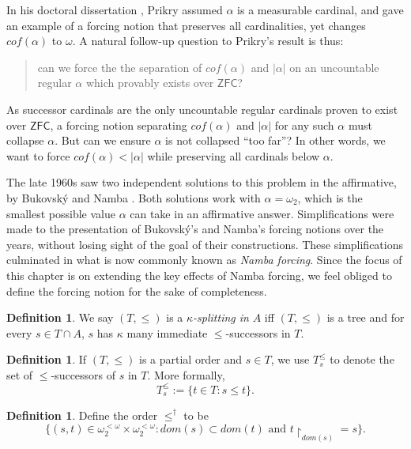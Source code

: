 \documentclass[12pt, twoside]{memoir}
\numberwithin{equation}{section}
\theoremstyle{definition}
\newtheorem{defi}[thm]{Definition}
\theoremstyle{remark}
\theoremstyle{definition}
\theoremstyle{definition}
\theoremstyle{definition}
\theoremstyle{remark}
\begin{document}
In his doctoral dissertation \cite{prikry}, Prikry assumed $\alpha$ is a measurable cardinal, and gave an example of a forcing notion that preserves all cardinalities, yet changes $cof(\alpha)$ to $\omega$. A natural follow-up question to Prikry's result is thus:

\begin{quote}
    can we force the the separation of $cof(\alpha)$ and $|\alpha|$ on an uncountable regular $\alpha$ which provably exists over $\mathsf{ZFC}$?
\end{quote}

As successor cardinals are the only uncountable regular cardinals proven to exist over $\mathsf{ZFC}$, a forcing notion separating $cof(\alpha)$ and $|\alpha|$ for any such $\alpha$ must collapse $\alpha$. But can we ensure $\alpha$ is not collapsed ``too far''? In other words, we want to force $cof(\alpha) < |\alpha|$ while preserving all cardinals below $\alpha$.

The late 1960s saw two independent solutions to this problem in the affirmative, by Bukovsk\'{y} \cite{bukovsky} and Namba \cite{namba}. Both solutions work with $\alpha = \omega_2$, which is the smallest possible value $\alpha$ can take in an affirmative answer. Simplifications were made to the presentation of Bukovsk\'{y}'s and Namba's forcing notions over the years, without losing sight of the goal of their constructions. These simplifications culminated in what is now commonly known as \emph{Namba forcing}. Since the focus of this chapter is on extending the key effects of Namba forcing, we feel obliged to define the forcing notion for the sake of completeness.

\begin{defi}
We say $(T, \leq)$ is a $\kappa$\emph{-splitting in} $A$ iff $(T, \leq)$ is a tree and for every $s \in T \cap A$, $s$ has $\kappa$ many immediate $\leq$-successors in $T$. 
\end{defi}

\begin{defi}
If $(T, \leq)$ is a partial order and $s \in T$, we use $T_s^{\leq}$ to denote the set of $\leq$-successors of $s$ in $T$. More formally, $$T_s^{\leq} := \{t \in T : s \leq t\}.$$ 
\end{defi}

\begin{defi}
Define the order $\leq^{\dagger}$ to be $$\{(s, t) \in \omega_2^{< \omega} \times \omega_2^{< \omega} : dom(s) \subset dom(t) \text{ and } t \! \restriction_{dom(s)} = s\}.$$
\end{defi}
\end{document}

